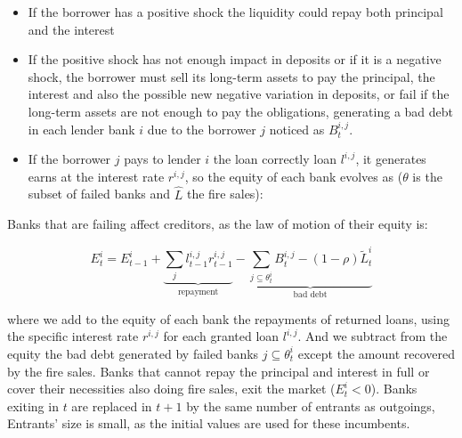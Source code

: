 \documentclass{article}
\begin{document}
\begin{itemize}
\item If the borrower has a positive shock the liquidity could repay both principal and the interest
\item If the positive shock has not enough impact in deposits or if it is a negative shock, the borrower must sell its long-term assets to pay the principal, the interest and also the possible new negative variation in deposits, or fail if the long-term assets are not enough to pay the obligations, generating a bad debt in each lender bank $i$ due to the borrower $j$ noticed as $B^{i,j}_t$.
\item If the borrower $j$ pays to lender $i$ the loan correctly loan $l^{i,j}$, it generates earns at the interest rate $r^{i,j}$, so the equity of each bank evolves as ($\theta$ is the subset of failed banks and $\hat{L}$ the fire sales):
\end{itemize}


Banks that are failing affect creditors, as the law of motion of their equity is:

\begin{equation}
    E_t^i = E_{t-1}^i + \underbrace{ \sum_{j} l_{t-1}^{i,j} r_{t-1}^{i,j} }_{\text{repayment}}- \underbrace {\sum_{j \subseteq \theta_t^i} B_t^{i,j} - (1 - \rho) \tilde{L}_t^i}_{\text{bad debt}}
\label{eq:bank_equity}
\end{equation}

where we add to the equity of each bank the repayments of returned loans, using the specific interest rate $r^{i,j}$ for each granted loan $l^{i,j}$. And we subtract from the equity the bad debt generated by failed banks $j \subseteq \theta_t^i$ except the amount recovered by the fire sales.
Banks that cannot repay the principal and interest in full or cover their necessities also doing fire sales, exit the market ($E^i_t<0$). Banks exiting in $t$ are replaced in $t+1$ by the same number of entrants as outgoings, Entrants' size is small, as the initial values are used for these incumbents.
\end{document}

